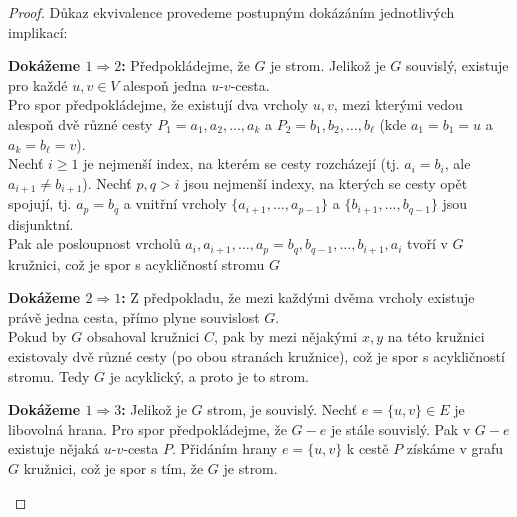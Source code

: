 \begin{proof}
Důkaz ekvivalence provedeme postupným dokázáním jednotlivých implikací:\bigskip

\noindent\textbf{Dokážeme $1 \Rightarrow 2$:}
Předpokládejme, že $G$ je strom. Jelikož je $G$ souvislý, existuje pro každé $u, v \in V$ alespoň jedna $u$-$v$-cesta. \\

\noindent Pro spor předpokládejme, že existují dva vrcholy $u, v$, mezi kterými vedou alespoň dvě různé cesty $P_1 = a_1, a_2, \dots, a_k$ a $P_2 = b_1, b_2, \dots, b_\ell$ (kde $a_1 = b_1 = u$ a $a_k = b_\ell = v$). \\

\noindent Nechť $i \ge 1$ je nejmenší index, na kterém se cesty rozcházejí (tj. $a_i = b_i$, ale $a_{i+1} \neq b_{i+1}$). Nechť $p, q > i$ jsou nejmenší indexy, na kterých se cesty opět spojují, tj. $a_p = b_q$ a vnitřní vrcholy $\{a_{i+1}, \dots, a_{p-1}\}$ a $\{b_{i+1}, \dots, b_{q-1}\}$ jsou disjunktní.\\

\noindent Pak ale posloupnost vrcholů $a_i, a_{i+1}, \dots, a_p = b_q, b_{q-1}, \dots, b_{i+1}, a_i$ tvoří v $G$ kružnici, což je spor s acykličností stromu $G$

\begin{center}
        
\end{center}

\bigskip

\noindent\textbf{Dokážeme $2 \Rightarrow 1$:}
Z předpokladu, že mezi každými dvěma vrcholy existuje právě jedna cesta, přímo plyne souvislost $G$. \\

\noindent Pokud by $G$ obsahoval kružnici $C$, pak by mezi nějakými $x, y$ na této kružnici existovaly dvě různé cesty (po obou stranách kružnice), což je spor s acykličností stromu. Tedy $G$ je acyklický, a proto je to strom.

\bigskip

\noindent\textbf{Dokážeme $1 \Rightarrow 3$:}
Jelikož je $G$ strom, je souvislý. Nechť $e = \{u, v\} \in E$ je libovolná hrana. Pro spor předpokládejme, že $G - e$ je stále souvislý. Pak v $G - e$ existuje nějaká $u$-$v$-cesta $P$. Přidáním hrany $e = \{u, v\}$ k cestě $P$ získáme v grafu $G$ kružnici, což je spor s tím, že $G$ je strom. \bigskip

\begin{center}
    
\end{center}


\end{proof}
